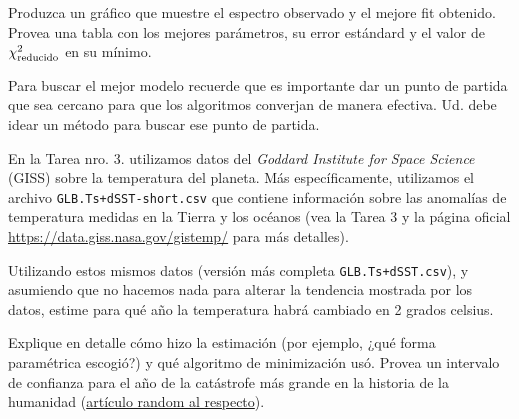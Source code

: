 \documentclass[letter, 11pt]{article}
\begin{document}
Produzca un gráfico que muestre el espectro observado y el mejore fit obtenido.
Provea una tabla con los mejores parámetros, su error estándard y el valor de
$\chi^2_{\rm reducido}$ en su mínimo.


\begin{ayuda}
Para buscar el mejor modelo recuerde que es importante dar un punto de partida
que sea cercano para que los algoritmos converjan de manera efectiva. Ud. debe
idear un método para buscar ese punto de partida.
\end{ayuda}


\vspace{1em}

En la Tarea nro. 3. utilizamos datos del \emph{Goddard Institute for Space
Science} (GISS) sobre la temperatura del planeta. Más específicamente,
utilizamos el archivo \texttt{GLB.Ts+dSST-short.csv} que contiene información
sobre las anomalías de temperatura medidas en la Tierra y los océanos (vea la
Tarea 3 y la página oficial
\href{https://data.giss.nasa.gov/gistemp/}{https://data.giss.nasa.gov/gistemp/}
para más detalles).

Utilizando estos mismos datos (versión más completa \texttt{GLB.Ts+dSST.csv}),
y asumiendo que no hacemos nada para alterar la tendencia mostrada por los
datos, estime para qué año la temperatura habrá cambiado en 2 grados celsius.

Explique en detalle cómo hizo la estimación (por ejemplo, ¿qué forma
paramétrica escogió?) y qué algoritmo de minimización usó. Provea un intervalo
de confianza para el año de la catástrofe más grande en la historia de la
humanidad
(\href{http://theconversation.com/why-is-climate-changes-2-degrees-celsius-of-warming-limit-so-important-82058}{artículo
random al respecto}).
\end{document}
